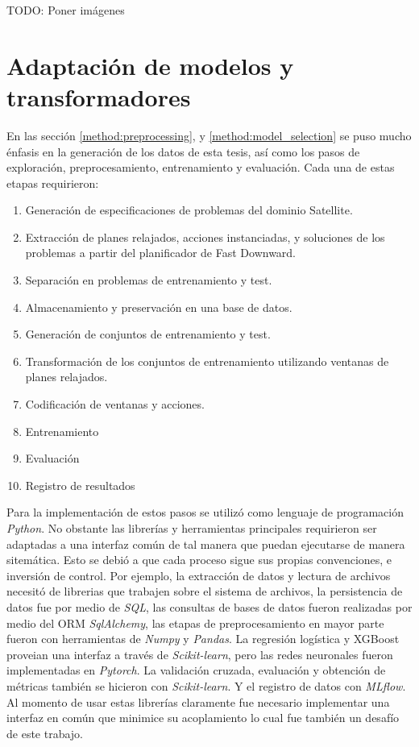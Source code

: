 TODO: Poner imágenes

\section{Adaptación de modelos y transformadores}

En las sección \ref{method:preprocessing}, y \ref{method:model_selection} se puso mucho énfasis en la generación de los datos de esta tesis, así como los pasos de exploración, preprocesamiento, entrenamiento y evaluación. Cada una de estas etapas requirieron:

\begin{enumerate}
    \item Generación de especificaciones de problemas del dominio Satellite.
    \item Extracción de planes relajados, acciones instanciadas, y soluciones de los problemas a partir del planificador de Fast Downward.
    \item Separación en problemas de entrenamiento y test.
    \item Almacenamiento y preservación en una base de datos.
    \item Generación de conjuntos de entrenamiento y test.
    \item Transformación de los conjuntos de entrenamiento utilizando ventanas de planes relajados.
    \item Codificación de ventanas y acciones.
    \item Entrenamiento
    \item Evaluación
    \item Registro de resultados
\end{enumerate}

Para la implementación de estos pasos se utilizó como lenguaje de programación \emph{Python}. No obstante las librerías y herramientas principales requirieron ser adaptadas a una interfaz común de tal manera que puedan ejecutarse de manera sitemática. Esto se debió a que cada proceso sigue sus propias convenciones, e inversión de control. Por ejemplo, la extracción de datos y lectura de archivos necesitó de librerias que trabajen sobre el sistema de archivos, la persistencia de datos fue por medio de \emph{SQL}, las consultas de bases de datos fueron realizadas por medio del ORM \emph{SqlAlchemy}, las etapas de preprocesamiento en mayor parte fueron con herramientas de \emph{Numpy} y \emph{Pandas}. La regresión logística y XGBoost proveian una interfaz a través de \emph{Scikit-learn}, pero las redes neuronales fueron implementadas en \emph{Pytorch}. La validación cruzada, evaluación y obtención de métricas también se hicieron con \emph{Scikit-learn}. Y el registro de datos con \emph{MLflow}. Al momento de usar estas librerías claramente fue necesario implementar una interfaz en común que minimice su acoplamiento lo cual fue también un desafío de este trabajo.
